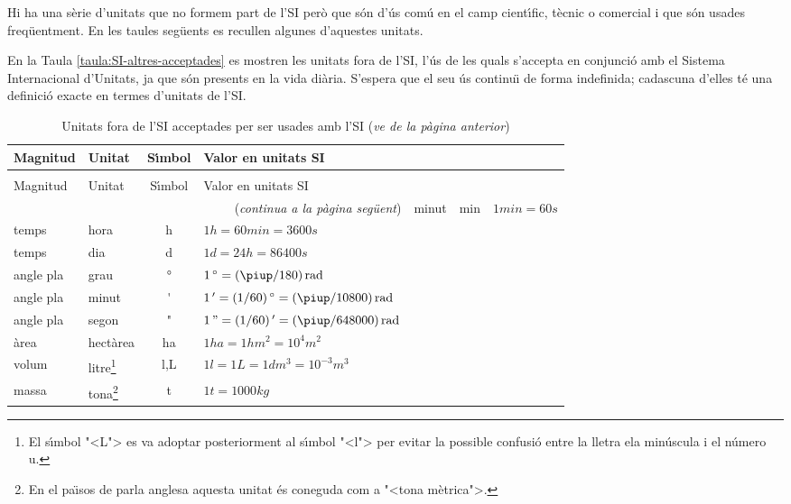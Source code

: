 Hi ha una s\`{e}rie d'unitats que no formem part de l'SI per\`{o} que s\'{o}n d'\'{u}s com\'{u} en el camp cient\'{\i}fic, t\`{e}cnic o comercial i que s\'{o}n usades freq\"{u}entment. En les taules seg\"{u}ents es recullen algunes d'aquestes unitats.

En la Taula \vref{taula:SI-altres-acceptades} es mostren les unitats fora de l'SI, l'\'{u}s de les quals s'accepta en conjunci\'{o} amb el Sistema Internacional d'Unitats, ja que s\'{o}n presents en la vida di\`{a}ria. S'espera que el seu \'{u}s continu\"{\i} de forma indefinida; cadascuna d'elles t\'{e} una definici\'{o} exacte en termes d'unitats de l'SI.

\begin{longtable}[h]{llcl}
   \caption{\label{taula:SI-altres-acceptades} Unitats fora de l'SI acceptades per ser usades amb l'SI  }\\
   \toprule[1pt]
    Magnitud & Unitat &  S\'{\i}mbol & Valor en unitats SI\\
   \midrule
   \endfirsthead
   \caption[]{Unitats fora de l'SI acceptades per ser usades amb l'SI (\emph{ve de la p\`{a}gina
   anterior})}\\
   \toprule[1pt]
    Magnitud & Unitat &  S\'{\i}mbol & Valor en unitats SI\\
   \midrule
   \endhead
   \midrule
   \multicolumn{4}{r}{(\emph{continua a la p\`{a}gina seg\"{u}ent})}
   \endfoot
   \endlastfoot
   temps & minut &  \unit{min}& $1\unit{min} = 60\unit{s}$ \\
   temps & hora & \unit{h} & $1\unit{h} = 60\unit{min} = 3600\unit{s}$ \\
   temps & dia & \unit{d} & $1\unit{d} = 24\unit{h} = 86400\unit{s}$\\
   angle pla & grau &  \unit{\degree} &   $1\unit{\degree} = (\piup/180)\unit{rad}$ \\
   angle pla & minut & \unit{'} & $1\unit{'} = (1/60)\unit{\degree} = (\piup/10800)\unit{rad}$ \\
   angle pla & segon & \unit{"} & $1\unit{"} = (1/60)\unit{'} = (\piup/648000)\unit{rad}$ \\
   \`{a}rea & hect\`{a}rea & \unit{ha} & $1\unit{ha} = 1\unit{hm^2} = 10^4\unit{m^2}$\\
   volum & litre\footnote{El s\'{\i}mbol {"<}L{">} es va adoptar posteriorment al s\'{\i}mbol {"<}l{">} per evitar la possible confusi\'{o} entre la lletra ela min\'{u}scula i  el n\'{u}mero u.}& \unit{l},\unit{L} & $1\unit{l} = 1\unit{L} = 1\unit{dm^3} = 10^{-3}\unit{m^3}$ \\
   massa & tona\footnote{En el pa\"{\i}sos de parla anglesa aquesta unitat \'{e}s coneguda com a {"<}tona m\`{e}trica{">}.} & \unit{t} & $1\unit{t} =1000\unit{kg}$\\
   \bottomrule[1pt]
\end{longtable}
\index{$\degree$}

